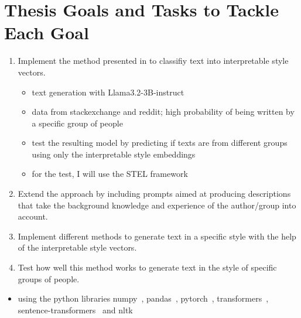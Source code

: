 
\section{Thesis Goals and Tasks to Tackle Each Goal}

\begin{enumerate}[label=\textbf{Goal \arabic*:}]
  \item Implement the method presented in \citet{patelLearningInterpretableStyle2023} to classifiy text into interpretable style vectors.
  \begin{itemize}
    \item text generation with Llama3.2-3B-instruct~\cite{dubeyLlama3Herd2024}
    \item data from stackexchange and reddit; high probability of being written by a specific group of people
    \item test the resulting model by predicting if texts are from different groups using only the interpretable style embeddings
    \item for the test, I will use the STEL framework\cite{wegmann-nguyen-2021-capture}
  \end{itemize}
  \item Extend the approach by including prompts aimed at producing descriptions that take the background knowledge and experience of the author/group into account.
  \item Implement different methods to generate text in a specific style with the help of the interpretable style vectors.
  \item Test how well this method works to generate text in the style of specific groups of people.
\end{enumerate}

\begin{itemize}
  \item using the python libraries numpy~\cite{harris2020array}, pandas~\cite{reback2020pandas,mckinney-proc-scipy-2010}, pytorch~\cite{paszkePyTorchImperativeStyle2019}, transformers~\cite{wolfHuggingFacesTransformersStateart2020}, sentence-transformers~\cite{reimersSentenceBERTSentenceEmbeddings2019} and nltk~\cite{birdNaturalLanguageProcessing2009}
\end{itemize}
